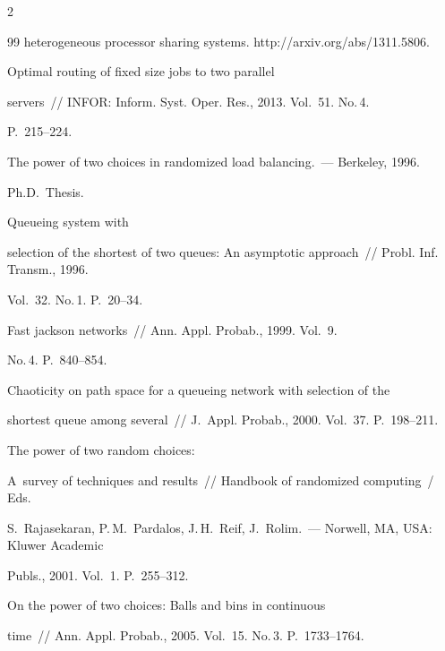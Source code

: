 \begin{multicols}{2}
{{\begin{thebibliography}{99}
heterogeneous processor sharing systems. {\sf http://arxiv.org/abs/1311.5806}.




     Optimal routing of fixed size jobs to two parallel 


servers~// INFOR: Inform. Syst. Oper. Res., 2013. Vol.~51. No.\,4. 


P.~215--224.




     The power of two choices in randomized load balancing.~--- Berkeley, 1996.


    Ph.D.\  Thesis.




     Queueing system with 


selection of the shortest of two queues: An asymptotic approach~// Probl. Inf. Transm., 1996. 


Vol.~32. No.\,1. P.~20--34.




     Fast jackson networks~// Ann. Appl. Probab., 1999. Vol.~9. 


No.\,4. P.~840--854.




     Chaoticity on path space for a queueing network with selection of the 


shortest queue among several~// J.~Appl. Probab., 2000. Vol.~37. P.~198--211.




     The power of two random choices: 


A~survey of techniques and results~// Handbook of randomized computing~/ Eds. 


S.~Rajasekaran, P.\,M.~Pardalos, J.\,H.~Reif, J.~Rolim.~--- Norwell, MA, USA: Kluwer Academic 


Publs., 2001.  Vol.~1. P.~255--312.




     On the power of two choices: Balls and bins in continuous 


time~// Ann. Appl. Probab., 2005. Vol.~15. No.\,3. P.~1733--1764.





\end{thebibliography}}}
\end{multicols}
